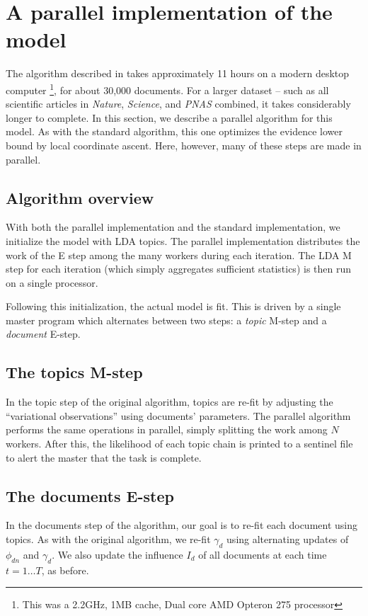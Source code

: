 \section{A parallel implementation of the model}
\label{section:influence_parallel_inference}

The algorithm described in  takes
approximately 11 hours on a modern desktop computer \footnote{This was
a 2.2GHz, 1MB cache, Dual core AMD Opteron 275 processor}, for about
30,000 documents.  For a larger dataset -- such as all scientific
articles in \emph{Nature}, \emph{Science}, and \emph{PNAS} combined,
it takes considerably longer to complete.  In this section, we
describe a parallel algorithm for this model.  As with the standard
algorithm, this one optimizes the evidence lower bound by local coordinate
ascent.  Here, however, many of these steps are made in parallel.

\subsection{Algorithm overview}
With both the parallel implementation and the standard implementation,
we initialize the model with LDA topics.  The parallel implementation
distributes the work of the E step among the many workers during each
iteration.  The LDA M step for each iteration (which simply aggregates
sufficient statistics) is then run on a single processor.

Following this initialization, the actual model is fit.  This is
driven by a single master program which alternates between two steps:
a \emph{topic} M-step and a \emph{document} E-step.

\subsection{The topics M-step}
In the topic step of the original algorithm, topics are re-fit by
adjusting the ``variational observations'' using documents'
parameters.  The parallel algorithm performs the same operations in
parallel, simply splitting the work among $N$ workers.  After this,
the likelihood of each topic chain is printed to a sentinel file to
alert the master that the task is complete.

\subsection{The documents E-step}
In the documents step of the algorithm, our goal is to re-fit each document using topics.
As with the original algorithm, we re-fit $\gamma_d$ using alternating
updates of $\phi_{dn}$ and $\gamma_d$.  We also update the influence
$I_d$ of all documents at each time $t=1 \ldots T$, as before.

